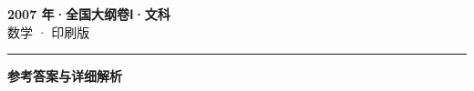 \documentclass[zihao=5, a4paper]{ctexart}
\begin{document}
\begin{center}
  {\Large\bfseries 2007 年·全国大纲卷Ⅰ·文科}\\[4pt]
  {\large 数学 · 印刷版}
\end{center}
\medskip
{}

\par\bigskip\hrule\bigskip
{}
\begin{center}{\large\bfseries 参考答案与详细解析}\end{center}
\smallskip

\end{document}
